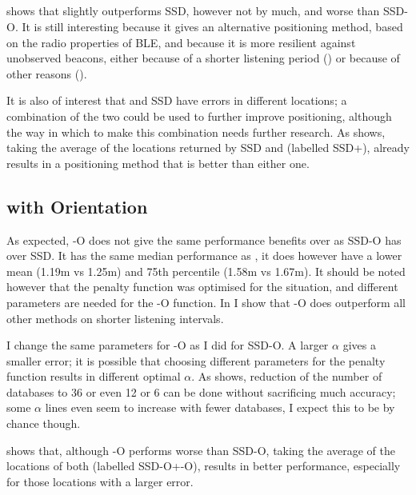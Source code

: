 \subsection{\BRP}
 shows that \aBRP slightly outperforms SSD, however not by much, and worse than SSD-O.
It is still interesting because it gives an alternative positioning method, based on the radio properties of BLE, and because it is more resilient against unobserved beacons, either because of a shorter listening period () or because of other reasons ().

It is also of interest that \aBRP and SSD have errors in different locations; a combination of the two could be used to further improve positioning, although the way in which to make this combination needs further research.
As  shows, taking the average of the locations returned by SSD and \aBRP (labelled SSD+\aBRP), already results in a positioning method that is better than either one.

\subsection{\BRP with Orientation}
As expected, \aBRP-O does not give the same performance benefits over \aBRP as SSD-O has over SSD.
It has the same median performance as \aBRP, it does however have a lower mean (1.19m vs 1.25m) and 75th percentile (1.58m vs 1.67m).
It should be noted however that the \aBRP penalty function was optimised for the \aBRP situation, and different parameters are needed for the \aBRP-O function.
In  I show that \aBRP-O does outperform all other methods on shorter listening intervals.

I change the same parameters for \aBRP-O as I did for SSD-O.
A larger $\alpha$ gives a smaller error; it is possible that choosing different parameters for the penalty function results in different optimal $\alpha$.
As  shows, reduction of the number of databases to 36 or even 12 or 6 can be done without sacrificing much accuracy; some $\alpha$ lines even seem to increase with fewer databases, I expect this to be by chance though.

 shows that, although \aBRP-O performs worse than SSD-O, taking the average of the locations of both (labelled SSD-O+\aBRP-O), results in better performance, especially for those locations with a larger error.

